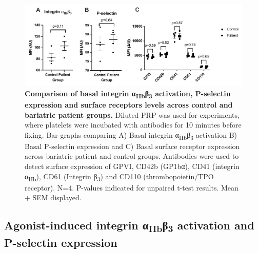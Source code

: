 \documentclass[11pt,twoside]{bristolthesis}
\begin{document}
\begin{figure}

{\centering \includegraphics[width=0.9\linewidth]{figure/Bariatric_study/Basal_surface_receptors} 

}

\caption[Comparison of basal integrin α\textsubscript{IIb}β\textsubscript{3} activation, P-selectin expression and surface receptors levels across control and bariatric patient groups]{\textbf{Comparison of basal integrin α\textsubscript{IIb}β\textsubscript{3} activation, P-selectin expression and surface receptors levels across control and bariatric patient groups.} Diluted PRP was used for experiments, where platelets were incubated with antibodies for 10 minutes before fixing. Bar graphs comparing A) Basal integrin α\textsubscript{IIb}β\textsubscript{3} activation B) Basal P-selectin expression and C) Basal surface receptor expression across bariatric patient and control groups. Antibodies were used to detect surface expression of GPVI, CD42b (GP1bα), CD41 (integrin α\textsubscript{IIb}), CD61 (Integrin β\textsubscript{3}) and CD110 (thrombopoietin/TPO receptor). N=4. P-values indicated for unpaired t-test results. Mean + SEM displayed.}\label{fig:basal-integrin-pselectin-receptor-bariatric}
\end{figure}
\hypertarget{agonist-induced-integrin-ux3b1iibux3b23-activation-and-p-selectin-expression}{%
\subsection{\texorpdfstring{Agonist-induced integrin α\textsubscript{IIb}β\textsubscript{3} activation and P-selectin expression}{Agonist-induced integrin αIIbβ3 activation and P-selectin expression}}\label{agonist-induced-integrin-ux3b1iibux3b23-activation-and-p-selectin-expression}}
\end{document}
